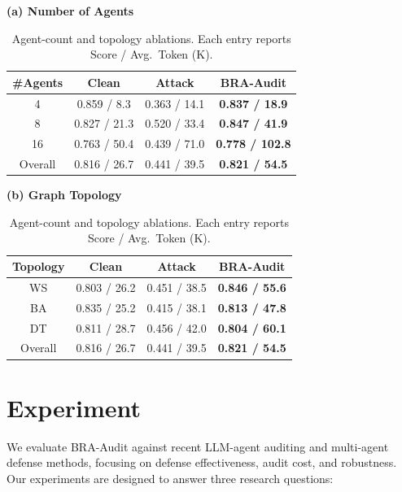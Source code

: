 \documentclass[letterpaper]{article} %
\begin{document}
\begin{table}[t]
\centering
\caption{Agent-count and topology ablations. Each entry reports
Score / Avg.\ Token (K).}
\label{tab:scale_topology_ablation}

\small
\renewcommand{\arraystretch}{1.15}

\begin{minipage}[t]{0.48\textwidth}
\centering
\textbf{(a) Number of Agents}

\medskip
\begin{tabular*}{\linewidth}
{@{\extracolsep{\fill}}cccc@{}}
\toprule
\textbf{\#Agents}
& \textbf{Clean}
& \textbf{Attack}
& \textbf{BRA-Audit} \\
\midrule
4
& 0.859 / 8.3
& 0.363 / 14.1
& \textbf{0.837 / 18.9} \\

8
& 0.827 / 21.3
& 0.520 / 33.4
& \textbf{0.847 / 41.9} \\

16
& 0.763 / 50.4
& 0.439 / 71.0
& \textbf{0.778 / 102.8} \\
\midrule
Overall
& 0.816 / 26.7
& 0.441 / 39.5
& \textbf{0.821 / 54.5} \\
\bottomrule
\end{tabular*}
\end{minipage}
\hfill
\begin{minipage}[t]{0.48\textwidth}
\centering
\textbf{(b) Graph Topology}

\medskip
\begin{tabular*}{\linewidth}
{@{\extracolsep{\fill}}cccc@{}}
\toprule
\textbf{Topology}
& \textbf{Clean}
& \textbf{Attack}
& \textbf{BRA-Audit} \\
\midrule
WS
& 0.803 / 26.2
& 0.451 / 38.5
& \textbf{0.846 / 55.6} \\

BA
& 0.835 / 25.2
& 0.415 / 38.1
& \textbf{0.813 / 47.8} \\

DT
& 0.811 / 28.7
& 0.456 / 42.0
& \textbf{0.804 / 60.1} \\
\midrule
Overall
& 0.816 / 26.7
& 0.441 / 39.5
& \textbf{0.821 / 54.5} \\
\bottomrule
\end{tabular*}
\end{minipage}

\end{table}
\section{Experiment}
We evaluate BRA-Audit against recent LLM-agent auditing and multi-agent defense methods, focusing on defense effectiveness, audit cost, and robustness. Our experiments are designed to answer three research questions:
\end{document}
